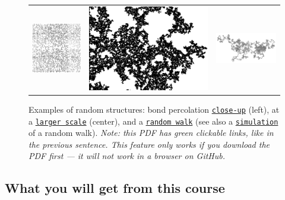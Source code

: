 \documentclass[oneside,11pt]{amsart}
\begin{document}
\begin{figure}[h]
	\begin{tabular}{ccc}
		\includegraphics[height=.32\textwidth]{img/Bond_percolation_p_51.png}
		&\hspace{10pt}\includegraphics[height=.32\textwidth]{img/Amas_de_percolation_gray.png}
		&\includegraphics[angle=90,height=.32\textwidth]{img/RW1.png}
	\end{tabular}
	\def\figurename{}
	\caption{Examples of random structures: bond percolation
	\href{https://en.wikipedia.org/wiki/Percolation_theory}{\texttt{close-up}}
	(left),
	at a \href{https://commons.wikimedia.org/wiki/File:Amas_de_percolation.png}{\texttt{larger scale}} (center),
	and
	a 
	\href{https://en.wikipedia.org/wiki/Random_walk\#Lattice_random_walk}{\texttt{random walk}}
	(see also a
	\href{https://upload.wikimedia.org/wikipedia/commons/f/f3/Random_walk_2500_animated.svg}{\texttt{simulation}} 
	of a random walk).
	\emph{Note:
	this PDF has green clickable links, like in the previous sentence.
	This feature only works if you download the PDF first --- it will not work in a browser on GitHub.}
	}
\end{figure}

\subsection*{What you will get from this course}
\end{document}

